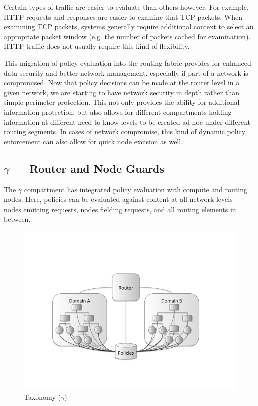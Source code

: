 \documentclass[12pt,letterpaper]{article}
\begin{document}
Certain types of traffic are easier to evaluate than others however.  For example, HTTP requests and responses are easier to examine that TCP packets.  When examining TCP packets, systems generally require additional context to select an appropriate packet window (e.g. the number of packets cached for examination).  HTTP traffic does not usually require this kind of flexibility.


This migration of policy evaluation into the routing fabric provides for enhanced data security and better network management, especially if part of a network is compromised.  Now that policy decisions can be made at the router level in a given network, we are starting to have network security in depth rather than simple perimeter protection.  This not only provides the ability for additional information protection, but also allows for different compartments holding information at different need-to-know levels to be created ad-hoc under different routing segments.  In cases of network compromise, this kind of dynamic policy enforcement can also allow for quick node excision as well.

\subsection{$\gamma$ ---  Router and Node Guards}
The $\gamma$ compartment has integrated policy evaluation with compute and routing nodes.  Here, policies can be evaluated against content at all network levels --- nodes emitting requests, nodes fielding requests, and all routing elements in between.

\begin{figure}[!t]
\centering
\includegraphics[width=5in]{model-gamma}
\caption{Taxonomy ($\gamma$)}
\label{fig:model:taxonomy-gamma}
\end{figure}
\end{document}
